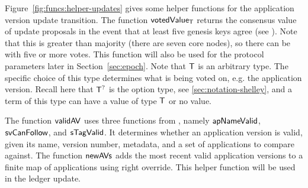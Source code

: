 \clearpage

Figure~\ref{fig:funcs:helper-updates} gives some helper functions for the
application version update transition.
The function $\mathsf{votedValue_T}$ returns
the consensus value of update proposals in the event that at least five
genesis keys agree (see \cite{delegation_design}). Note that this is greater
than majority (there are seven core nodes), so there can
be  with five or more votes.
This function will also be used for the protocol parameters later in Section~\ref{sec:epoch}.
Note that $\mathsf{T}$ is an arbitrary type. The specific choice of this type
determines what is being voted on, e.g. the application version.
Recall here that $\mathsf{T}^?$ is the option type, see \ref{sec:notation-shelley},
and a term of this type can have a value of type $\mathsf{T}$ or no value.

The function $\mathsf{validAV}$ uses three functions from \cite{byron_ledger_spec}, namely
$\mathsf{apNameValid}$, $\mathsf{svCanFollow}$, and $\mathsf{sTagValid}$. It determines
whether an application version is valid, given its name, version number,
metadata, and a set of applications to compare against.
The function $\mathsf{newAVs}$ adds the most recent valid application
versions to a finite map of applications using right override.
This helper function will be used in the ledger update.


